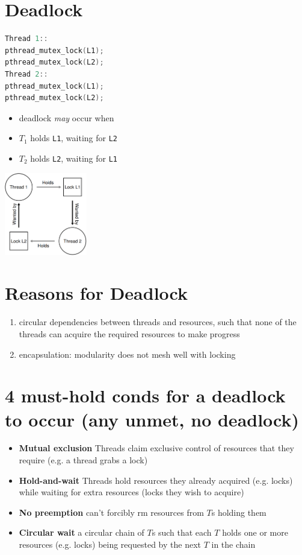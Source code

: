 \documentclass[8pt,a4paper,landscape]{extarticle}
\begin{document}
\begin{multicols*}{3}
\begin{minipage}{0.5\linewidth}
  \section*{Deadlock}
\begin{lstlisting}[language=c,frame=lines]
Thread 1::
pthread_mutex_lock(L1);
pthread_mutex_lock(L2);
Thread 2::
pthread_mutex_lock(L1);
pthread_mutex_lock(L2);
\end{lstlisting}
  \flushleft
  \begin{itemize}
  \item deadlock \emph{may} occur when
  \item $T_1$ holds \texttt{L1}, waiting for \texttt{L2}
  \item $T_2$ holds \texttt{L2}, waiting for \texttt{L1}
  \end{itemize}
\end{minipage}
\begin{minipage}{0.5\linewidth}
  \includegraphics[width=\linewidth,height=3.6cm]{imgs/deadlocks1}
\end{minipage}
\section*{Reasons for Deadlock}
\begin{enumerate}
\item circular dependencies between threads and resources, such that none of the threads can acquire the required resources to make progress
\item encapsulation: modularity does not mesh well with locking
\end{enumerate}
\section*{4 must-hold conds for a deadlock to occur (any unmet, no deadlock)}
\begin{itemize}
\item \textbf{Mutual exclusion} Threads claim exclusive control of resources that they require (e.g. a thread grabs a lock)
\item \textbf{Hold-and-wait} Threads hold resources they already acquired (e.g. locks) while waiting for extra resources (locks they wish to acquire)
\item \textbf{No preemption} can't forcibly rm resources from $T$s holding them
\item \textbf{Circular wait} a circular chain of $T$s such that each $T$ holds one or more resources (e.g. locks) being requested by the next $T$ in the chain
\end{itemize}

\end{multicols*}
\end{document}
